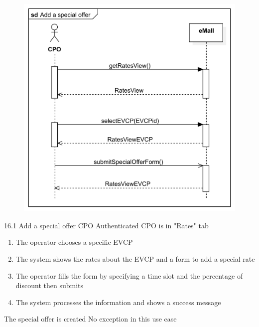 \pagebreak
\usecase
{
    \begin{figure}[H]
        \centering
        \includegraphics[scale=0.9]{src/sequence_diagram/specialOffer.png}
    \end{figure}
}
{16.1}
{Add a special offer} %
{CPO} %
{Authenticated CPO is in "Rates" tab} %
{ %
    \begin{enumerate}
        \item The operator chooses a specific EVCP
        \item The system shows the rates about the EVCP and a form to add a special rate
        \item The operator fills the form by specifying a time slot and the percentage of discount then submits
        \item The system processes the information and shows a success message
    \end{enumerate}
}
{The special offer is created} %
{ %
    No exception in this use case
}
{ %
}

